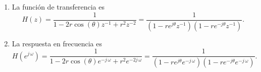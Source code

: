 \begin{enumerate}
\item  La funci\'{o}n de transferencia es
\begin{equation}
H\left( z\right) =\frac{1}{1-2r\cos \left( \theta \right) z^{-1}+r^{2}z^{-2}%
}=\frac{1}{\left( 1-re^{j\theta }z^{-1}\right) \left( 1-re^{-j\theta
}z^{-1}\right) }.
\end{equation}

\item  La respuesta en frecuencia es
\begin{equation}
H\left( e^{j \, \omega }\right) =\frac{1}{1-2r\cos \left( \theta \right)
e^{-j \, \omega }+r^{2}e^{-2j \, \omega }}=\frac{1}{\left( 1-re^{j\theta
}e^{-j \, \omega }\right) \left( 1-re^{-j\theta }e^{-j \, \omega }\right) }.
\end{equation}
\end{enumerate}

